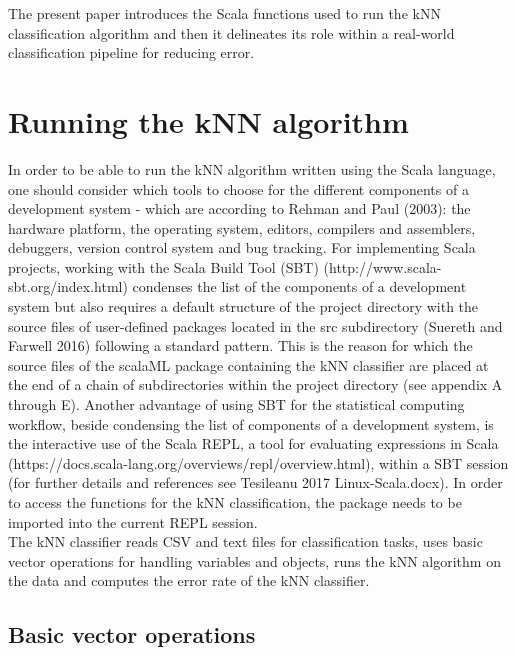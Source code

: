 \documentclass[journal]{IEEEtran}
\begin{document}
      
The present paper introduces the Scala functions used to run the kNN classification algorithm and then it delineates its role within a real-world classification pipeline for reducing error.    
   
\section{Running the kNN algorithm}

In order to be able to run the kNN algorithm written using the Scala language, one should consider which tools to choose for the different components of a development system -  which are according to Rehman and Paul (2003): the hardware platform, the operating system, editors, compilers and assemblers, debuggers, version control system and bug tracking.
For implementing Scala projects, working with the Scala Build Tool (SBT) (http://www.scala-sbt.org/index.html) condenses the list of the components of a development system but also requires a default structure of the project directory with the source files of user-defined packages located in the src subdirectory (Suereth and Farwell 2016) following a standard pattern. This is the reason for which the source files of the scalaML package containing the kNN classifier are placed at the end of a chain of subdirectories within the project directory (see appendix A through E). 
Another advantage of using SBT for the statistical computing workflow, beside condensing the list of components of a development system, is the interactive use of the Scala REPL, a tool for evaluating expressions in Scala (https://docs.scala-lang.org/overviews/repl/overview.html), within a SBT session (for further details and references see Tesileanu 2017 Linux-Scala.docx).  
In order to access the functions for the kNN classification, the package needs to be imported into the current REPL session.\\


The kNN classifier reads CSV and text files for classification tasks, uses basic vector operations for handling variables and objects, runs the kNN algorithm on the data and computes the error rate of the kNN classifier.

\subsection{Basic vector operations}
\end{document}
